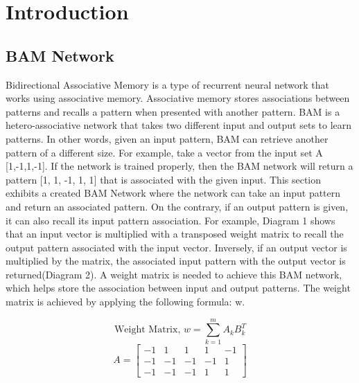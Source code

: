 \documentclass[12pt]{article}
\begin{document}

\tableofcontents
\clearpage

\setlength{\parskip}{\baselineskip}%



\section{Introduction}

\subsection{BAM Network}
Bidirectional Associative Memory is a type of recurrent neural network that works using associative memory. Associative memory stores associations between patterns and recalls a pattern when presented with another pattern. BAM is a hetero-associative network that takes two different input and output sets to learn patterns. In other words, given an input pattern, BAM can retrieve another pattern of a different size. For example, take a vector from the input set A [1,-1,1,-1]. If the network is trained properly, then the BAM network will return a pattern [1, 1, -1, 1, 1] that is associated with the given input. This section exhibits a created BAM Network where the network can take an input pattern and return an associated pattern. On the contrary, if an output pattern is given, it can also recall its input pattern association. For example, Diagram 1 shows that an input vector is multiplied with a 
transposed weight matrix to recall the output pattern associated with the input vector. Inversely, if an output vector is multiplied by the matrix, the associated input pattern with the output vector is returned(Diagram 2). A weight matrix is needed to achieve this BAM network, which helps store the association between input and output patterns. The weight matrix is achieved by applying the following formula: w. 

\[
\text{Weight Matrix, }
w = \sum_{k=1}^{m} A_k B_k^T
\]
\[
A = \begin{bmatrix}
-1 & 1 & 1 & 1 & -1 \\
-1 & -1 & -1 & -1 & 1 \\
-1 & -1 & -1 & 1 & 1 
\end{bmatrix}
\]
\end{document}
